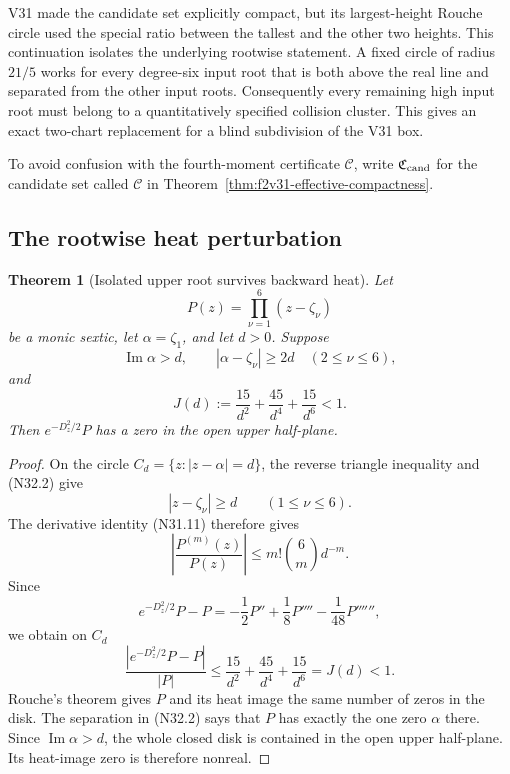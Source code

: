 \documentclass[11pt]{article}
\newtheorem{theorem}{Theorem}[section]
\theoremstyle{definition}
\theoremstyle{remark}
\begin{document}
V31 made the candidate set explicitly compact, but its largest-height
Rouche circle used the special ratio between the tallest and the other two
heights.  This continuation isolates the underlying rootwise statement.
A fixed circle of radius \(21/5\) works for every degree-six input root
that is both above the real line and separated from the other input roots.
Consequently every remaining high input root must belong to a quantitatively
specified collision cluster.  This gives an exact two-chart replacement for
a blind subdivision of the V31 box.

To avoid confusion with the fourth-moment certificate \(\mathcal C\), write
\(\mathfrak C_{\rm cand}\) for the candidate set called \(\mathcal C\) in
Theorem~\ref{thm:f2v31-effective-compactness}.

\subsection{The rootwise heat perturbation}

\begin{theorem}[Isolated upper root survives backward heat]
\label{thm:f2v32-isolated-root}
Let
\[
 P(z)=\prod_{\nu=1}^6(z-\zeta_\nu)
 \tag{N32.1}
\]
be a monic sextic, let \(\alpha=\zeta_1\), and let \(d>0\).  Suppose
\[
 \operatorname{Im}\alpha>d,\qquad
 |\alpha-\zeta_\nu|\geq2d\quad(2\leq\nu\leq6),
 \tag{N32.2}
\]
and
\[
 J(d):=\frac{15}{d^2}+\frac{45}{d^4}+\frac{15}{d^6}<1.
 \tag{N32.3}
\]
Then \(e^{-D_z^2/2}P\) has a zero in the open upper half-plane.
\end{theorem}

\begin{proof}
On the circle \(C_d=\{z:|z-\alpha|=d\}\), the reverse triangle
inequality and \textup{(N32.2)} give
\[
 |z-\zeta_\nu|\geq d\qquad(1\leq\nu\leq6).
 \tag{N32.4}
\]
The derivative identity \textup{(N31.11)} therefore gives
\[
 \left|\frac{P^{(m)}(z)}{P(z)}\right|
 \leq m!\binom6m d^{-m}.
 \tag{N32.5}
\]
Since
\[
 e^{-D_z^2/2}P-P
 =-\frac12P''+\frac18P''''-\frac1{48}P'''''',
 \tag{N32.6}
\]
we obtain on \(C_d\)
\[
 \frac{|e^{-D_z^2/2}P-P|}{|P|}
 \leq\frac{15}{d^2}+\frac{45}{d^4}+\frac{15}{d^6}
 =J(d)<1.
 \tag{N32.7}
\]
Rouche's theorem gives \(P\) and its heat image the same number of
zeros in the disk.  The separation in \textup{(N32.2)} says that \(P\)
has exactly the one zero \(\alpha\) there.  Since
\(\operatorname{Im}\alpha>d\), the whole closed disk is contained in
the open upper half-plane.  Its heat-image zero is therefore nonreal.
\end{proof}
\end{document}
